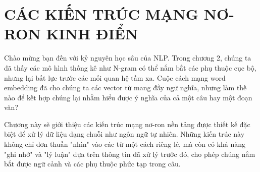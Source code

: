 \chapter{CÁC KIẾN TRÚC MẠNG NƠ-RON KINH ĐIỂN}
\label{chap:deep_learning_architectures}

Chào mừng bạn đến với kỷ nguyên học sâu của NLP. Trong chương 2, chúng ta đã thấy các mô hình thống kê như N-gram có thể nắm bắt các phụ thuộc cục bộ, nhưng lại bất lực trước các mối quan hệ tầm xa. Cuộc cách mạng word embedding đã cho chúng ta các vector từ mang đầy ngữ nghĩa, nhưng làm thế nào để kết hợp chúng lại nhằm hiểu được ý nghĩa của cả một câu hay một đoạn văn?

Chương này sẽ giới thiệu các kiến trúc mạng nơ-ron nền tảng được thiết kế đặc biệt để xử lý dữ liệu dạng chuỗi như ngôn ngữ tự nhiên. Những kiến trúc này không chỉ đơn thuần "nhìn" vào các từ một cách riêng lẻ, mà còn có khả năng "ghi nhớ" và "lý luận" dựa trên thông tin đã xử lý trước đó, cho phép chúng nắm bắt được ngữ cảnh và các phụ thuộc phức tạp trong câu.